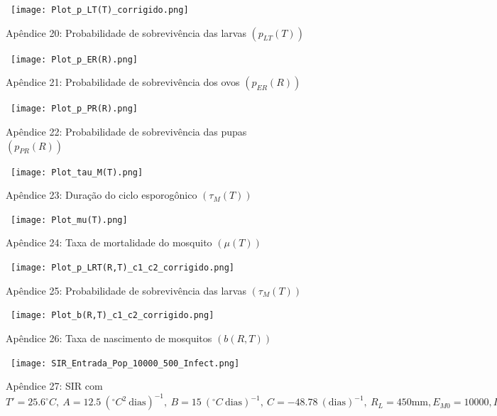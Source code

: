 \documentclass[
	12pt,				%
	oneside,			%
	a4paper,			%
	english,			%
	brazil				%
	]{abntex2}
\begin{document}
\begin{apendicesenv}
\begin{figure}[!ht]
	\centering
	\hbox{\hspace{2.5em} \texttt{[image: Plot\_p\_LT(T)\_corrigido.png]}}
	\caption*{Apêndice 20: Probabilidade de sobrevivência das larvas $(p_{LT}(T))$} 
\end{figure} 
\newpage
\begin{figure}[!ht]
	\centering
	\hbox{\hspace{3.0em} \texttt{[image: Plot\_p\_ER(R).png]}}
	\caption*{Apêndice 21: Probabilidade de sobrevivência dos ovos $(p_{ER}(R))$} 
\end{figure} 
\begin{figure}[!ht]
	\centering
	\hbox{\hspace{2.5em} \texttt{[image: Plot\_p\_PR(R).png]}}
	\caption*{Apêndice 22: Probabilidade de sobrevivência das pupas $(p_{PR}(R))$} 
\end{figure} 
\newpage
\begin{figure}[!ht]
	\centering
	\hbox{\hspace{3.0em} \texttt{[image: Plot\_tau\_M(T).png]}}
	\caption*{Apêndice 23: Duração do ciclo esporogônico $(\tau_{M}(T))$} 
\end{figure} 
\begin{figure}[!ht]
	\centering
	\hbox{\hspace{1.0em} \texttt{[image: Plot\_mu(T).png]}}
	\caption*{Apêndice 24: Taxa de mortalidade do mosquito $(\mu(T))$} 
\end{figure} 
\newpage
\begin{figure}[!ht]
	\centering
	\hbox{\hspace{3.5em} \texttt{[image: Plot\_p\_LRT(R,T)\_c1\_c2\_corrigido.png]}}
	\caption*{Apêndice 25: Probabilidade de sobrevivência das larvas $(\tau_{M}(T))$} 
\end{figure} 
\begin{figure}[!ht]
	\centering
	\hbox{\hspace{3.5em} \texttt{[image: Plot\_b(R,T)\_c1\_c2\_corrigido.png]}}
	\caption*{Apêndice 26: Taxa de nascimento de mosquitos $(b(R,T))$} 
\end{figure} 
\newpage
\begin{figure}[!ht]
	\centering
	\hbox{\hspace{2.7em} \texttt{[image: SIR\_Entrada\_Pop\_10000\_500\_Infect.png]}}
	\caption*{Apêndice 27: SIR com $T'=25.6^\circ C, \ A=12.5 \ (^\circ C^2 \ \text{dias})^{-1}, \ B=15 \ (^\circ C \ \text{dias})^{-1}, \ C=-48.78 \ (\text{dias})^{-1}, \ R_L=450 \text{mm}, E_{M0}=10000, I_{H0}=500$} 

\end{figure}
\end{apendicesenv}
\end{document}
